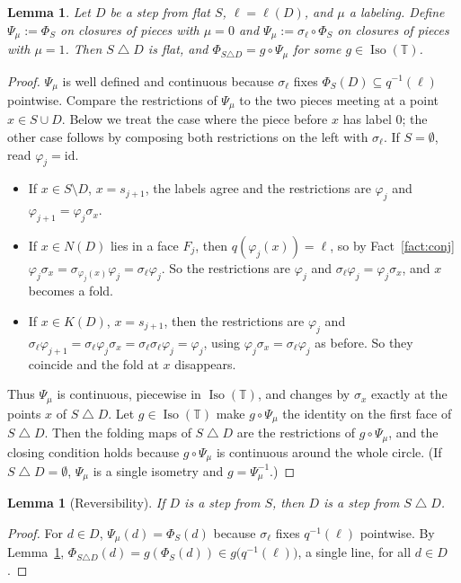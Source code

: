 \documentclass[11pt]{amsart}
\newtheorem{lemma}[theorem]{Lemma}
\theoremstyle{definition}
\theoremstyle{remark}
\newcommand{\T}{\mathbb{T}}
\newcommand{\Iso}{\operatorname{Iso}}
\begin{document}
\begin{lemma}\label{lem:result}
Let $D$ be a step from flat $S$, $\ell=\ell(D)$, and $\mu$ a labeling. Define
$\Psi_\mu:=\Phi_S$ on closures of pieces with $\mu=0$ and $\Psi_\mu:=\sigma_\ell\circ\Phi_S$ on
closures of pieces with $\mu=1$. Then $S\mathbin{\triangle}D$ is flat, and
$\Phi_{S\triangle D}=g\circ\Psi_\mu$ for some $g\in\Iso(\T)$.
\end{lemma}
\begin{proof}
$\Psi_\mu$ is well defined and continuous because $\sigma_\ell$ fixes
$\Phi_S(D)\subseteq q^{-1}(\ell)$ pointwise. Compare the restrictions of $\Psi_\mu$ to the two
pieces meeting at a point $x\in S\cup D$. Below we treat the case where the piece before $x$ has
label $0$; the other case follows by composing both restrictions on the left with $\sigma_\ell$.
If $S=\emptyset$, read $\varphi_j=\mathrm{id}$.
\begin{itemize}[leftmargin=*]
\item If $x\in S\setminus D$, $x=s_{j+1}$, the labels agree and the restrictions are $\varphi_j$
and $\varphi_{j+1}=\varphi_j\sigma_x$.
\item If $x\in N(D)$ lies in a face $F_j$, then $q(\varphi_j(x))=\ell$, so by
Fact~\ref{fact:conj} $\varphi_j\sigma_x=\sigma_{\varphi_j(x)}\varphi_j=\sigma_\ell\varphi_j$.
So the restrictions are $\varphi_j$ and $\sigma_\ell\varphi_j=\varphi_j\sigma_x$, and $x$ becomes
a fold.
\item If $x\in K(D)$, $x=s_{j+1}$, then
the restrictions are $\varphi_j$ and
$\sigma_\ell\varphi_{j+1}=\sigma_\ell\varphi_j\sigma_x=\sigma_\ell\sigma_\ell\varphi_j=\varphi_j$,
using $\varphi_j\sigma_x=\sigma_\ell\varphi_j$ as before. So they coincide and the fold at $x$
disappears.
\end{itemize}
Thus $\Psi_\mu$ is continuous, piecewise in $\Iso(\T)$, and changes by $\sigma_x$ exactly at the
points $x$ of $S\mathbin{\triangle}D$. Let $g\in\Iso(\T)$ make $g\circ\Psi_\mu$ the identity on the first face of
$S\mathbin{\triangle}D$. Then the folding maps of $S\mathbin{\triangle}D$ are the restrictions of
$g\circ\Psi_\mu$, and the closing condition holds because $g\circ\Psi_\mu$ is continuous around
the whole circle. (If $S\mathbin{\triangle}D=\emptyset$, $\Psi_\mu$ is a single isometry and
$g=\Psi_\mu^{-1}$.)
\end{proof}

\begin{lemma}[Reversibility]\label{lem:rev}
If $D$ is a step from $S$, then $D$ is a step from $S\mathbin{\triangle}D$.
\end{lemma}
\begin{proof}
For $d\in D$, $\Psi_\mu(d)=\Phi_S(d)$ because $\sigma_\ell$ fixes $q^{-1}(\ell)$ pointwise. By
Lemma~\ref{lem:result}, $\Phi_{S\triangle D}(d)=g(\Phi_S(d))\in g\bigl(q^{-1}(\ell)\bigr)$, a single
line, for all $d\in D$.
\end{proof}
\end{document}
